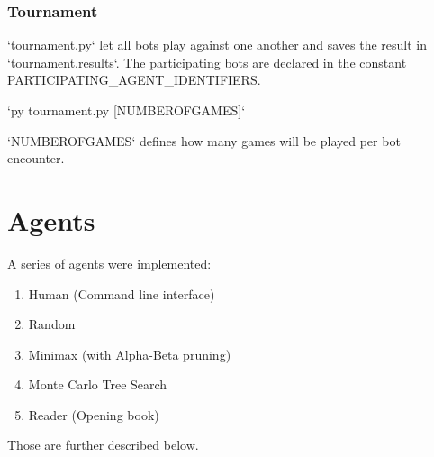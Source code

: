 \subsubsection{Tournament}
`tournament.py` let all bots play against one another and saves the result
in `tournament.results`.
The participating bots are declared in the constant
PARTICIPATING_AGENT_IDENTIFIERS.

`py tournament.py [NUMBEROFGAMES]`

`NUMBEROFGAMES` defines how many games will be played per bot encounter.


\section{Agents}

A series of agents were implemented:
\begin{enumerate}
    \item Human (Command line interface)
    \item Random
    \item Minimax (with Alpha-Beta pruning)
    \item Monte Carlo Tree Search
    \item Reader (Opening book)
\end{enumerate}

Those are further described below.

